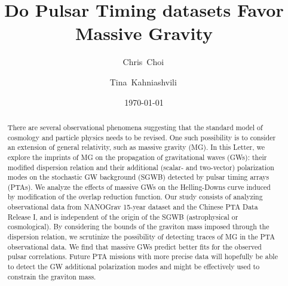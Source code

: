 \documentclass[prd,twocolumn,aps,psfig,nofootinbib,nobibnotes,superscriptaddress,preprintnumbers,times]{revtex4-2}
\newcommand{\eV}{\,{\rm eV}}
\begin{document}
\title{Do Pulsar Timing datasets Favor Massive Gravity}

\date{\today}
\author{Chris~Choi\,}

\author{Tina~Kahniashvili\,}

\begin{abstract}
There are several observational phenomena suggesting that the standard model of cosmology and particle physics needs to be revised. One such possibility is to consider an extension of general relativity, such as massive gravity (MG). In this Letter, we explore the imprints of MG on the propagation of gravitational waves (GWs): their modified dispersion relation and their additional (scalar- and two-vector) polarization modes on the stochastic GW background (SGWB) detected by pulsar timing arrays (PTAs). We analyze the effects of massive GWs on the Helling-Downs curve induced by modification of the overlap reduction function. Our study consists of analyzing observational data from NANOGrav 15-year dataset and the Chinese PTA Data Release I, and is independent of the origin of the SGWB (astrophysical or cosmological).   
By considering the bounds of the graviton mass imposed through the dispersion relation, 
we scrutinize the possibility of detecting traces of MG in the PTA observational data. 
We find that massive GWs predict better fits for the observed pulsar correlations. Future PTA missions %
with more precise data will hopefully be able to detect the GW additional polarization modes and 
might be effectively used to constrain the graviton mass.
\end{abstract}
\end{document}
